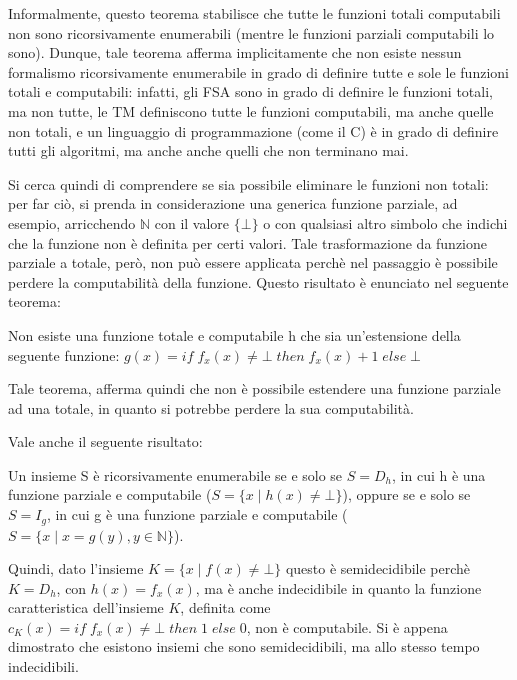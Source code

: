   Informalmente, questo teorema stabilisce che tutte le funzioni totali computabili non sono ricorsivamente enumerabili (mentre le funzioni parziali computabili lo sono). Dunque, tale teorema afferma implicitamente che non esiste nessun formalismo ricorsivamente enumerabile in grado di definire tutte e sole le funzioni totali e computabili: infatti, gli FSA sono in grado di definire le funzioni totali, ma non tutte, le TM definiscono tutte le funzioni computabili, ma anche quelle non totali, e un linguaggio di programmazione (come il C) è in grado di definire tutti gli algoritmi, ma anche anche quelli che non terminano mai. 
  
  Si cerca quindi di comprendere se sia possibile eliminare le funzioni non totali: per far ciò, si prenda in considerazione una generica funzione parziale, ad esempio, arricchendo \(\mathbb{N}\) con il valore \(\{\bot\}\) o con qualsiasi altro simbolo che indichi che la funzione non è definita per certi valori. Tale trasformazione da funzione parziale a totale, però, non può essere applicata perchè nel passaggio è possibile perdere la computabilità della funzione. Questo risultato è enunciato nel seguente teorema:
  
  \begin{theorem}
    Non esiste una funzione totale e computabile h che sia un'estensione della seguente funzione:
    \(g(x)=if\;f_x(x)\neq\bot\;then\;f_x(x)+1\;else\;\bot\)
  \end{theorem}

  Tale teorema, afferma quindi che non è possibile estendere una funzione parziale ad una totale, in quanto si potrebbe perdere la sua computabilità.

  Vale anche il seguente risultato:
  \begin{theorem}
    Un insieme S è ricorsivamente enumerabile se e solo se \(S=D_h\), in cui h è una funzione parziale e computabile (\(S=\{x\;|\;h(x)\neq \bot\}\)), oppure se e solo se \(S=I_g\), in cui g è una funzione parziale e computabile (\(S=\{x\;|\;x=g(y), y\in \mathbb{N}\}\)).
  \end{theorem}

  Quindi, dato l'insieme \(K=\{x\;|\;f(x) \neq \bot\}\) questo è semidecidibile perchè \(K=D_h\), con \(h(x)=f_x(x)\), ma è anche indecidibile in quanto la funzione caratteristica dell'insieme \(K\), definita come \(c_K(x)=if\;f_x(x)\neq \bot\;then\;1\;else\;0\), non è computabile. Si è appena dimostrato che esistono insiemi che sono semidecidibili, ma allo stesso tempo indecidibili.

